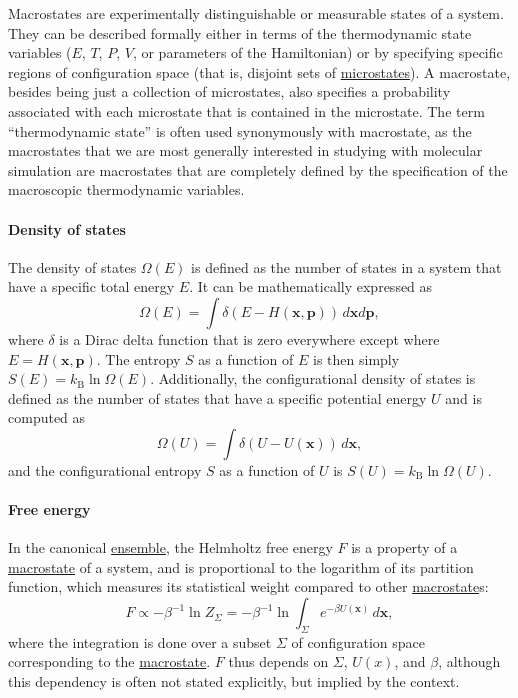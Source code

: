 \documentclass[9pt,review]{livecoms}
\newcommand{\vx}{\mathbf{x}}
\newcommand{\vp}{\mathbf{p}}
\begin{document}
Macrostates are experimentally distinguishable or measurable states of a system.
They can be described formally either in terms of the thermodynamic state variables ($E$, $T$, $P$, $V$, or parameters of the Hamiltonian) or by specifying specific regions of configuration space (that is, disjoint sets of \hyperlink{ref:Microstate} {microstates}). A macrostate, besides being just a collection of microstates, also specifies a probability associated with each microstate that is contained in the microstate. The term ``thermodynamic state'' is often used synonymously with macrostate, as the macrostates that we are most generally interested in studying with molecular simulation are macrostates that are completely defined by the specification of the macroscopic thermodynamic variables.

\hypertarget{ref:density_of_states}{\paragraph{Density of states}}
The density of states $\Omega(E)$ is defined as the number of states in a system that have a specific total energy $E$.  It can be mathematically expressed as
\begin{equation}
\Omega(E) = \int \delta(E-H(\vx,\vp))\, d\vx d\vp,
\end{equation}
where $\delta$ is a Dirac delta function that is zero everywhere except where $E=H(\vx,\vp)$. The entropy $S$ as a function of $E$ is then simply $S(E)=k_\mathrm{B} \ln \Omega(E)$. Additionally, the configurational density of states is defined as the number of states that have a specific potential energy $U$ and is computed as
\begin{equation}
\Omega(U) = \int \delta(U-U(\vx))\, d\vx,
\end{equation}
and the configurational entropy $S$ as a function of $U$ is $S(U)=k_\mathrm{B} \ln \Omega(U)$.

\hypertarget{ref:FE} {\paragraph{Free energy}}
In the canonical \hyperlink{ref:Ensemble} {ensemble}, the Helmholtz free energy $F$ is a property of a \hyperlink{ref:Macrostate} {macrostate} of a system, and is proportional to the logarithm of its partition function, which measures its statistical weight compared to other \hyperlink{ref:Macrostate} {macrostate}s:
\begin{equation}
F \propto -\beta^{-1} \ln Z_{\Sigma} = -\beta^{-1} \ln \int_\Sigma e^{-\beta U(\vx)} \, d\vx,
\end{equation}
where the integration is done over a subset $\Sigma$ of configuration space corresponding to the \hyperlink{ref:Macrostate} {macrostate}. $F$ thus depends on $\Sigma$, $U(x)$, and $\beta$, although this dependency is often not stated explicitly, but implied by the context.
\end{document}
